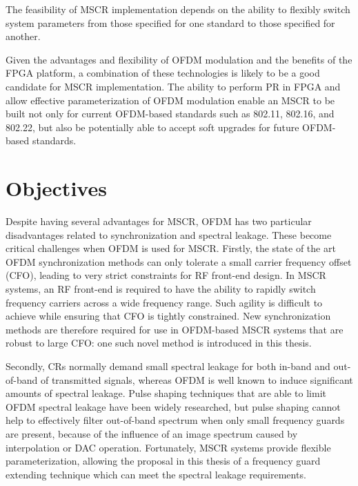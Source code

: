The feasibility of MSCR implementation depends on the ability to flexibly switch system parameters from those specified for one standard to those specified for another.

Given the advantages and flexibility of OFDM modulation and the benefits of the FPGA platform, a combination of these technologies is likely to be a good candidate for MSCR implementation.
The ability to perform PR in FPGA and allow effective parameterization of OFDM modulation enable an MSCR to be built not only for current OFDM-based standards such as 802.11, 802.16, and 802.22, but also be potentially able to accept soft upgrades for future OFDM-based standards.

\section{Objectives}

Despite having several advantages for MSCR, OFDM has two particular disadvantages related to synchronization and spectral leakage. These become critical challenges when OFDM is used for MSCR.
Firstly, the state of the art OFDM synchronization methods can only tolerate a small carrier frequency offset (CFO),  leading to very strict constraints for RF front-end design.
In MSCR systems, an RF front-end is required to have the ability to rapidly switch frequency carriers across a wide frequency range.
Such agility is difficult to achieve while ensuring that CFO is tightly constrained.
New synchronization methods are therefore required for use in OFDM-based MSCR systems that are robust to large CFO: one such novel method is introduced in this thesis.

Secondly, CRs normally demand small spectral leakage for both in-band and out-of-band of transmitted signals, whereas OFDM is well known to induce significant amounts of spectral leakage.
Pulse shaping techniques that are able to limit OFDM spectral leakage have been widely researched, but pulse shaping cannot help to effectively filter out-of-band spectrum when only small frequency guards are present, because of the influence of an image spectrum caused by interpolation or DAC operation.
Fortunately, MSCR systems provide flexible parameterization, allowing the proposal in this thesis of a frequency guard extending technique which can meet the spectral leakage requirements.

